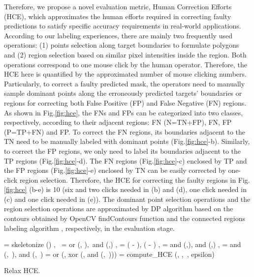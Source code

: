 \documentclass[10pt,twocolumn,letterpaper]{article}
\newcommand{\figref}[1]{Fig.\ref{#1}}
\begin{document}
Therefore, we propose a novel evaluation metric, Human Correction Efforts (HCE), which approximates the human efforts required in correcting faulty predictions to satisfy specific accuracy requirements in real-world applications. According to our labeling experiences, there are mainly two frequently used operations: (1) points selection along target boundaries to formulate polygons and (2) region selection based on similar pixel intensities inside the region. Both operations correspond to one mouse click by the human operator. Therefore, the HCE here is quantified by the approximated number of mouse clicking numbers. 
Particularly, to correct a faulty predicted mask, the operators need to manually sample dominant points along the erroneously predicted targets' boundaries or regions for correcting both False Positive (FP) and False Negative (FN) regions. 
As shown in \figref{fig:hce}, the FNs and FPs can be categorized into two classes, respectively, according to their adjacent regions: FN (N=TN+FP), FN, FP (P=TP+FN) and FP. 
To correct the FN regions, its boundaries adjacent to the TN need to be manually labeled with dominant points (\figref{fig:hce}-b). Similarly, to correct the FP regions, we only need to label its boundaries adjacent to the TP regions (\figref{fig:hce}-d). The FN regions (\figref{fig:hce}-c) enclosed by TP and the FP regions (\figref{fig:hce}-e) enclosed by TN can be easily corrected by one-click region selection. Therefore, the HCE for correcting the faulty regions in \figref{fig:hce} (b-e) is 10 (six and two clicks needed in (b) and (d), one click needed in (c) and one click needed in (e)). The dominant point selection operations and the region selection operations are approximated by DP algorithm \cite{DBLP:journals/cvgip/Ramer72} based on the contours obtained by OpenCV findContours \cite{DBLP:journals/cvgip/SuzukiA85} function and the connected regions labeling algorithm \cite{DBLP:journals/tcs/FiorioG96,DBLP:conf/miip/WuOS05}, respectively, in the evaluation stage. 

\begin{algorithm}[t!]
\scriptsize
\KwIn{,~,~,~}
\KwOut{}
 = skeletonize ()\;
,~ = or (, ),~and (,)\;
, =  ( - ), ( - )\;
,  = and (,), and (,)\;
,  = and (,~), and (,~)\;
 = or (, xor (, and (,~)))\;
 = compute\_HCE (, ,~, epsilon)
\caption{\small Relax HCE.}
\label{alg:relax_hce}

\end{algorithm}
\end{document}
